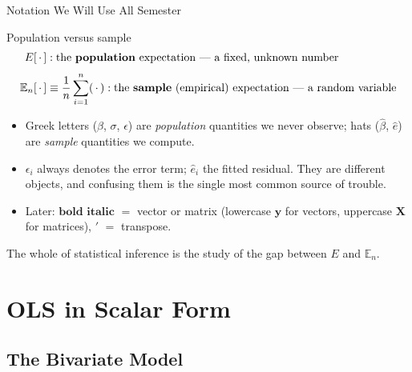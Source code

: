 \documentclass[aspectratio=169,11pt,xcolor=dvipsnames]{beamer}
\newcommand{\E}{E}
\newcommand{\En}{\mathbb{E}_n}
\newcommand{\X}{\bm{X}}
\newcommand{\Y}{\bm{y}}
\begin{document}
\begin{frame}[shrink=10]{Notation We Will Use All Semester}
\begin{block}{Population versus sample}
\begin{align*}
  \E[\,\cdot\,] &: \text{the \textbf{population} expectation --- a fixed, unknown number} \\[3pt]
  \En[\,\cdot\,] &\equiv \frac{1}{n}\sum_{i=1}^{n} (\,\cdot\,)
  : \text{the \textbf{sample} (empirical) expectation --- a random variable}
\end{align*}
\end{block}
\vskip2pt
\begin{itemize}\itemsep3pt
  \item Greek letters ($\beta$, $\sigma$, $\epsilon$) are \emph{population}
        quantities we never observe; hats ($\hat\beta$, $\hat e$) are \emph{sample}
        quantities we compute.
  \item $\epsilon_i$ always denotes the error term; $\hat e_i$ the fitted residual.
        They are different objects, and confusing them is the single most common
        source of trouble.
  \item Later: $\bm{\text{bold italic}}$ $=$ vector or matrix (lowercase
        $\Y$ for vectors, uppercase $\X$ for matrices), $'$ $=$ transpose.
\end{itemize}
\vskip2pt
The whole of statistical inference is the study of the gap between $\E$ and $\En$.
\end{frame}

\section[Scalar OLS]{OLS in Scalar Form}
\begin{frame}\sectionpage\end{frame}

\subsection*{The Bivariate Model}
\begin{frame}\subsectionpage\end{frame}
\end{document}
